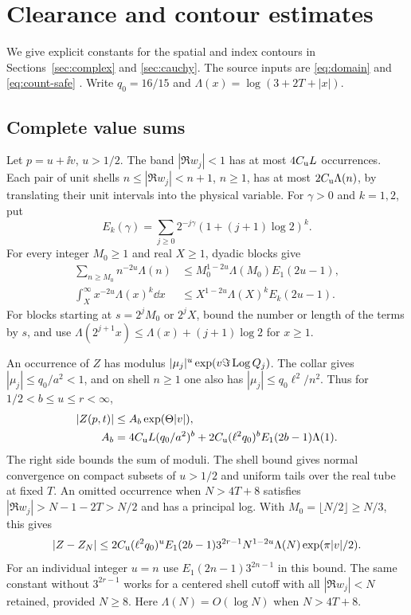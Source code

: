 \section{Clearance and contour estimates}
\label{app:estimates}

We give explicit constants for the spatial and index contours in
Sections~\ref{sec:complex} and \ref{sec:cauchy}. The source inputs
are \eqref{eq:domain} and \eqref{eq:count-safe}
\cite{BakerBase,BakerGT41}. Write \(q_0=16/15\) and
\(\Lambda(x)=\log(3+2T+|x|)\).

\subsection{Complete value sums}\label{app:value-sums}

Let \(p=u+\ii v\), \(u>1/2\). The band \(|\Re w_j|<1\) has at
most \(4C_{\mathrm u} L\) occurrences. Each pair of unit shells
\(n\le|\Re w_j|<n+1\), \(n\ge1\), has at most
\(2C_{\mathrm u}\Lambda(n)\), by translating their unit intervals into
the physical variable. For \(\gamma>0\) and \(k=1,2\), put
\begin{equation}
 E_k(\gamma)=\sum_{j\ge0}2^{-j\gamma}(1+(j+1)\log 2)^k .
 \label{app:dyadic}
\end{equation}
For every integer \(M_0\ge1\) and real \(X\ge1\), dyadic blocks
give
\begin{align*}
 \sum_{n\ge M_0} n^{-2u}\Lambda(n)
    &\le M_0^{1-2u}\Lambda(M_0) E_1(2u-1),\\
 \int_X^\infty x^{-2u}\Lambda(x)^k\dd x
    &\le X^{1-2u}\Lambda(X)^k E_k(2u-1).
\end{align*}
For blocks starting at \(s=2^jM_0\) or \(2^jX\), bound the
number or length of the terms by \(s\), and use
\(\Lambda(2^{j+1}x)\le\Lambda(x)+(j+1)\log2\) for \(x\ge1\).

An occurrence of \(Z\) has modulus
\(|\mu_j|^u\exp(v\Im\operatorname{Log} Q_j)\).
The collar gives \(|\mu_j|\le q_0/a^2<1\), and on shell \(n\ge1\)
one also has \(|\mu_j|\le q_0\ell^2/n^2\). Thus for
\(1/2<b\le u\le r<\infty\),
\begin{equation}
\begin{split}
 |Z(p,t)|&\le A_b \exp(\Theta|v|),\\
 A_b&=4C_{\mathrm u} L(q_0/a^2)^b+
        2C_{\mathrm u}(\ell^2q_0)^b E_1(2b-1)\Lambda(1).
\end{split}
\label{app:value-envelope}
\end{equation}
The right side bounds the sum of moduli. The shell bound gives
normal convergence on compact subsets of \(u>1/2\) and uniform
tails over the real tube at fixed \(T\). An omitted occurrence
when \(N>4T+8\) satisfies \(|\Re w_j|>N-1-2T>N/2\) and has a
principal log. With \(M_0=\lfloor N/2\rfloor\ge N/3\), this gives
\begin{equation}
 |Z-Z_N|\le 2C_{\mathrm u}(\ell^2q_0)^u E_1(2b-1)3^{2r-1}
                N^{1-2u}\Lambda(N)\exp(\pi|v|/2).
 \label{app:divisor-tail}
\end{equation}
For an individual integer \(u=n\) use \(E_1(2n-1)3^{2n-1}\) in
this bound. The same constant without \(3^{2r-1}\) works for
a centered shell cutoff with all \(|\Re w_j|<N\) retained,
provided \(N\ge8\). Here \(\Lambda(N)=O(\log N)\) when \(N>4T+8\).

